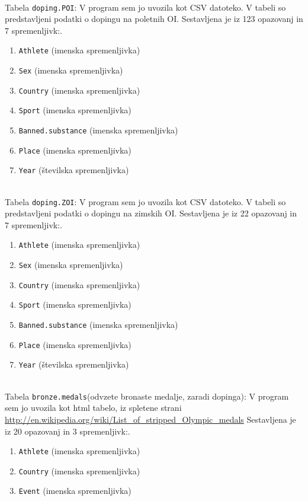 \documentclass[11pt,a4paper]{article}
\begin{document}
\
\\
Tabela \verb|doping.POI|:
V program sem jo uvozila kot CSV datoteko. V tabeli so predstavljeni podatki o dopingu na poletnih OI.
Sestavljena je iz 123 opazovanj in 7 spremenljivk:.
\begin{enumerate}
\item{\verb|Athlete| (imenska spremenljivka)}
\item{\verb|Sex| (imenska spremenljivka)}
\item{\verb|Country| (imenska spremenljivka)}
\item{\verb|Sport| (imenska spremenljivka)}
\item{\verb|Banned.substance| (imenska spremenljivka)}
\item{\verb|Place| (imenska spremenljivka)}
\item{\verb|Year| (številska spremenljivka)}

\end{enumerate}
\
\\
Tabela \verb|doping.ZOI|:
V program sem jo uvozila kot CSV datoteko. V tabeli so predstavljeni podatki o dopingu na zimskih OI.
Sestavljena je iz 22 opazovanj in 7 spremenljivk:.
\begin{enumerate}
\item{\verb|Athlete| (imenska spremenljivka)}
\item{\verb|Sex| (imenska spremenljivka)}
\item{\verb|Country| (imenska spremenljivka)}
\item{\verb|Sport| (imenska spremenljivka)}
\item{\verb|Banned.substance| (imenska spremenljivka)}
\item{\verb|Place| (imenska spremenljivka)}
\item{\verb|Year| (številska spremenljivka)}

\end{enumerate}

\
\\
Tabela \verb|bronze.medals|(odvzete bronaste medalje, zaradi dopinga):
V program sem jo uvozila kot html tabelo, iz spletene strani \url{http://en.wikipedia.org/wiki/List_of_stripped_Olympic_medals}
Sestavljena je iz 20 opazovanj in 3 spremenljivk:.
\begin{enumerate}
\item{\verb|Athlete| (imenska spremenljivka)}
\item{\verb|Country| (imenska spremenljivka)}
\item{\verb|Event| (imenska spremenljivka)}

\end{enumerate}
\end{document}
